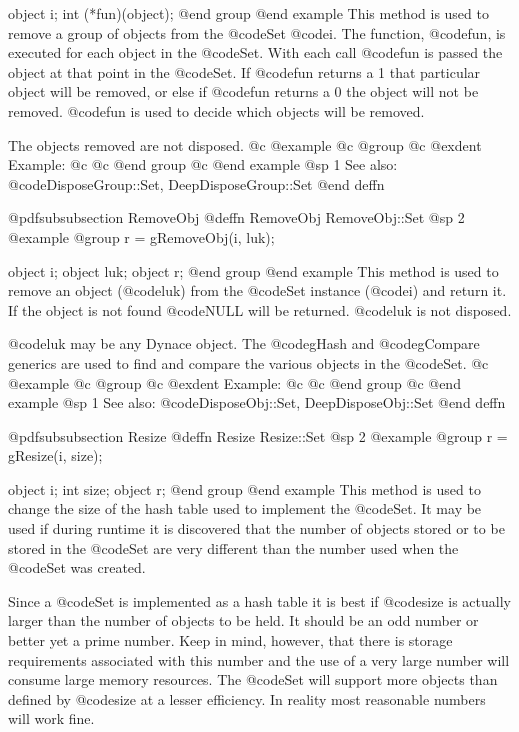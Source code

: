 object  i;
int     (*fun)(object);
@end group
@end example
This method is used to remove a group of objects from the @code{Set}
@code{i}.  The function, @code{fun}, is executed for each
object in the @code{Set}.  With each call @code{fun} is passed the
object at that point in the @code{Set}.  If @code{fun} returns a 1
that particular object will be removed, or else if @code{fun}
returns a 0 the object will not be removed.  @code{fun} is used
to decide which objects will be removed.

The objects removed are not disposed.
@c @example
@c @group
@c @exdent Example:
@c 
@c @end group
@c @end example
@sp 1
See also:  @code{DisposeGroup::Set, DeepDisposeGroup::Set}
@end deffn













@pdfsubsubsection {RemoveObj}
@deffn {RemoveObj} RemoveObj::Set
@sp 2
@example
@group
r = gRemoveObj(i, luk);

object  i;
object  luk;
object  r;
@end group
@end example
This method is used to remove an object (@code{luk}) from the @code{Set}
instance (@code{i}) and return it.  If the object is not found
@code{NULL} will be returned.  @code{luk} is not disposed.

@code{luk} may be any Dynace object.  The @code{gHash} and
@code{gCompare} generics are used to find and compare the various
objects in the @code{Set}.
@c @example
@c @group
@c @exdent Example:
@c 
@c @end group
@c @end example
@sp 1
See also:  @code{DisposeObj::Set, DeepDisposeObj::Set}
@end deffn













@pdfsubsubsection {Resize}
@deffn {Resize} Resize::Set
@sp 2
@example
@group
r = gResize(i, size);

object  i;
int     size;
object  r;
@end group
@end example
This method is used to change the size of the hash table used to
implement the @code{Set}.  It may be used if during runtime it is
discovered that the number of objects stored or to be stored in the
@code{Set} are very different than the number used when the @code{Set}
was created.

Since a @code{Set} is implemented as a hash table it is best if
@code{size} is actually larger than the number of objects to be held.
It should be an odd number or better yet a prime number.  Keep in mind,
however, that there is storage requirements associated with this number
and the use of a very large number will consume large memory resources.
The @code{Set} will support more objects than defined by @code{size} at
a lesser efficiency.  In reality most reasonable numbers will work fine.

